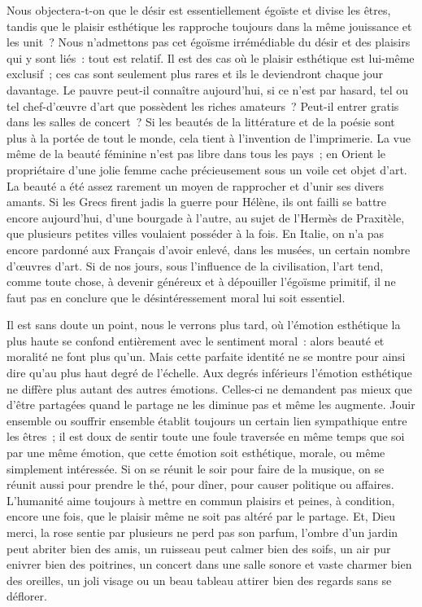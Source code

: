 \documentclass[french,twoside]{book} %
\begin{document}
Nous objectera-t-on que le désir est essentiellement égoïste et divise les êtres, tandis que le plaisir esthétique les rapproche toujours dans la même jouissance et les unit ? Nous n’admettons pas cet égoïsme irrémédiable du désir et des plaisirs qui y sont liés : tout est relatif. Il est des cas où le plaisir esthétique est lui-même exclusif ; ces cas sont seulement plus rares et ils le deviendront chaque jour davantage. Le pauvre peut-il connaître aujourd’hui, si ce n’est par hasard, tel ou tel chef-d’œuvre d’art que possèdent les riches amateurs ? Peut-il entrer gratis dans les salles de concert ? Si les beautés de la littérature et de la poésie sont plus à la portée de tout le monde, cela tient à l’invention de l’imprimerie. La vue même de la beauté féminine n’est pas libre dans tous les pays ; en Orient le propriétaire d’une jolie femme cache précieusement sous un voile cet objet d’art. La beauté a été assez rarement un moyen de rapprocher et d’unir ses divers amants. Si les Grecs firent jadis la guerre pour Hélène,  ils ont failli se battre encore aujourd’hui, d’une bourgade à l’autre, au sujet de l’Hermès de Praxitèle, que plusieurs petites villes voulaient posséder à la fois. En Italie, on n’a pas encore pardonné aux Français d’avoir enlevé, dans les musées, un certain nombre d’œuvres d’art. Si de nos jours, sous l’influence de la civilisation, l’art tend, comme toute chose, à devenir généreux et à dépouiller l’égoïsme primitif, il ne faut pas en conclure que le désintéressement moral lui soit essentiel.\par
Il est sans doute un point, nous le verrons plus tard, où l’émotion esthétique la plus haute se confond entièrement avec le sentiment moral : alors beauté et moralité ne font plus qu’un. Mais cette parfaite identité ne se montre pour ainsi dire qu’au plus haut degré de l’échelle. Aux degrés inférieurs l’émotion esthétique ne diffère plus autant des autres émotions. Celles-ci ne demandent pas mieux que d’être partagées quand le partage ne les diminue pas et même les augmente. Jouir ensemble ou souffrir ensemble établit toujours un certain lien sympathique entre les êtres ; il est doux de sentir toute une foule traversée en même temps que soi par une même émotion, que cette émotion soit esthétique, morale, ou même simplement intéressée. Si on se réunit le soir pour faire de la musique, on se réunit aussi pour prendre le thé, pour dîner, pour causer politique ou affaires. L’humanité aime toujours à mettre en commun plaisirs et peines, à condition, encore une fois, que le plaisir même ne soit pas altéré par le partage. Et, Dieu merci, la rose sentie par plusieurs ne perd pas son parfum, l’ombre d’un jardin peut abriter bien des amis, un ruisseau peut  calmer bien des soifs, un air pur enivrer bien des poitrines, un concert dans une salle sonore et vaste charmer bien des oreilles, un joli visage ou un beau tableau attirer bien des regards sans se déflorer.\par
\end{document}
